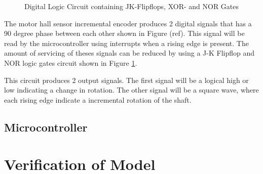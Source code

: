 \documentclass[a4paper,12pt]{article}
\begin{document}
	\begin{figure}[h]
		\centering
		
		\caption{Digital Logic Circuit containing JK-Flipflops, XOR- and NOR Gates}
		\label{fig:jk_xor}
	\end{figure}
	
	The motor hall sensor incremental encoder produces 2 digital signals  that has a 90 degree phase between each other shown in Figure (ref). This signal will be read by the microcontroller using interrupts when a rising edge is present. The amount of servicing of theses signals can be reduced by using a J-K Flipflop and NOR logic gates circuit shown in Figure \ref{fig:jk_xor}. 
	
	This circuit produces 2 output signals. The first signal will be a logical high or low indicating a change in rotation. The other signal will be a square wave, where each rising edge indicate a incremental rotation of the shaft. 
	
	\subsection{Microcontroller}
	
	
	
	\section{Verification of Model}
	

	\newpage
	
	
	
\end{document}

